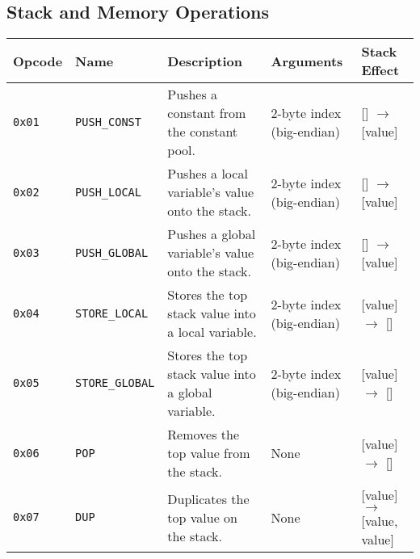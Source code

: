 \documentclass[a4paper,12pt]{article}
\begin{document}
\subsection{Stack and Memory Operations}
\begin{tabular}{|l|l|p{4cm}|l|l|}
\hline
\textbf{Opcode} & \textbf{Name} & \textbf{Description} & \textbf{Arguments} & \textbf{Stack Effect} \\ \hline
\texttt{0x01} & \texttt{PUSH\_CONST} & Pushes a constant from the constant pool. & 2-byte index (big-endian) & [] $\rightarrow$ [value] \\ \hline
\texttt{0x02} & \texttt{PUSH\_LOCAL} & Pushes a local variable's value onto the stack. & 2-byte index (big-endian) & [] $\rightarrow$ [value] \\ \hline
\texttt{0x03} & \texttt{PUSH\_GLOBAL} & Pushes a global variable's value onto the stack. & 2-byte index (big-endian) & [] $\rightarrow$ [value] \\ \hline
\texttt{0x04} & \texttt{STORE\_LOCAL} & Stores the top stack value into a local variable. & 2-byte index (big-endian) & [value] $\rightarrow$ [] \\ \hline
\texttt{0x05} & \texttt{STORE\_GLOBAL} & Stores the top stack value into a global variable. & 2-byte index (big-endian) & [value] $\rightarrow$ [] \\ \hline
\texttt{0x06} & \texttt{POP} & Removes the top value from the stack. & None & [value] $\rightarrow$ [] \\ \hline
\texttt{0x07} & \texttt{DUP} & Duplicates the top value on the stack. & None & [value] $\rightarrow$ [value, value] \\ \hline

\end{tabular}
\label{tab:stack_memory_operations}
\end{document}
